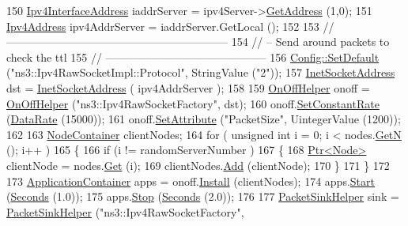 \begin{DoxyCode}
150   \hyperlink{classns3_1_1Ipv4InterfaceAddress}{Ipv4InterfaceAddress} iaddrServer = ipv4Server->\hyperlink{classns3_1_1Ipv4_a5aa7213c1365083840b2311a3cb5b24b}{GetAddress} (1,0);
151   \hyperlink{classns3_1_1Ipv4Address}{Ipv4Address} ipv4AddrServer = iaddrServer.GetLocal ();
152 
153   \textcolor{comment}{// ------------------------------------------------------------}
154   \textcolor{comment}{// -- Send around packets to check the ttl}
155   \textcolor{comment}{// --------------------------------------------}
156   \hyperlink{group__config_ga2e7882df849d8ba4aaad31c934c40c06}{Config::SetDefault} (\textcolor{stringliteral}{"ns3::Ipv4RawSocketImpl::Protocol"}, StringValue (\textcolor{stringliteral}{"2"}));
157   \hyperlink{classns3_1_1InetSocketAddress}{InetSocketAddress} dst = \hyperlink{classns3_1_1InetSocketAddress}{InetSocketAddress} ( ipv4AddrServer );
158 
159   \hyperlink{classns3_1_1OnOffHelper}{OnOffHelper} onoff = \hyperlink{classns3_1_1OnOffHelper}{OnOffHelper} (\textcolor{stringliteral}{"ns3::Ipv4RawSocketFactory"}, dst);
160   onoff.\hyperlink{classns3_1_1OnOffHelper_a73526acef24a4559fb50db9f7c1c10ef}{SetConstantRate} (\hyperlink{classns3_1_1DataRate}{DataRate} (15000));
161   onoff.\hyperlink{classns3_1_1OnOffHelper_a9f29b8db5fd9afa3075a74f48d30d914}{SetAttribute} (\textcolor{stringliteral}{"PacketSize"}, UintegerValue (1200));
162 
163   \hyperlink{classns3_1_1NodeContainer}{NodeContainer} clientNodes;
164   \textcolor{keywordflow}{for} ( \textcolor{keywordtype}{unsigned} \textcolor{keywordtype}{int} i = 0; i < nodes.\hyperlink{classns3_1_1NodeContainer_aed647ac56d0407a7706aba02eb44b951}{GetN} (); i++ )
165     \{
166       \textcolor{keywordflow}{if} (i != randomServerNumber )
167         \{
168           \hyperlink{classns3_1_1Ptr}{Ptr<Node>} clientNode = nodes.\hyperlink{classns3_1_1NodeContainer_a9ed96e2ecc22e0f5a3d4842eb9bf90bf}{Get} (i);
169           clientNodes.\hyperlink{classns3_1_1NodeContainer_aa60b3a0e70f2fb324e16ffcf8bf31fcb}{Add} (clientNode);
170         \}
171     \}
172 
173   \hyperlink{classns3_1_1ApplicationContainer}{ApplicationContainer} apps = onoff.\hyperlink{classns3_1_1OnOffHelper_aa4471e2fec7b08ad7c46aa568f424323}{Install} (clientNodes);
174   apps.\hyperlink{classns3_1_1ApplicationContainer_a8eff87926507020bbe3e1390358a54a7}{Start} (\hyperlink{group__timecivil_ga33c34b816f8ff6628e33d5c8e9713b9e}{Seconds} (1.0));
175   apps.\hyperlink{classns3_1_1ApplicationContainer_adfc52f9aa4020c8714679b00bbb9ddb3}{Stop} (\hyperlink{group__timecivil_ga33c34b816f8ff6628e33d5c8e9713b9e}{Seconds} (2.0));
176 
177   \hyperlink{classns3_1_1PacketSinkHelper}{PacketSinkHelper} sink = \hyperlink{classns3_1_1PacketSinkHelper}{PacketSinkHelper} (\textcolor{stringliteral}{"ns3::Ipv4RawSocketFactory"}, 

\end{DoxyCode}
